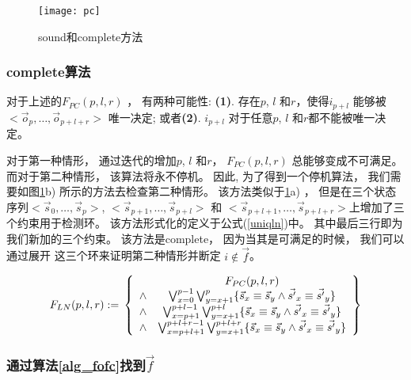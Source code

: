 \begin{figure}[t]
\begin{center}
\texttt{[image: pc]}
\end{center}
\caption{sound和complete方法}
  \label{fig_pc}
\end{figure}


%



\subsubsection{complete算法}\label{subsub_complete}
对于上述的$F_{PC}(p,l,r)$ ，
有两种可能性:
\textbf{(1)}. 存在$p$, $l$ 和$r$，使得$i_{p+l}$ 能够被$<\vec{o}_{p},\dots,\vec{o}_{p+l+r}>$ 唯一决定;
或者\textbf{(2)}. $i_{p+l}$ 对于任意$p$, $l$ 和$r$都不能被唯一决定。


对于第一种情形，
通过迭代的增加$p$, $l$ 和$r$，
$F_{PC}(p,l,r)$ 总能够变成不可满足。
而对于第二种情形，
该算法将永不停机。
因此,
为了得到一个停机算法，
我们需要如图\ref{fig_pc}b) 所示的方法去检查第二种情形。
该方法类似于\ref{fig_pc}a) ，
但是在三个状态序列$<\vec{s}_{0},\dots,\vec{s}_{p}>$, $<\vec{s}_{p+1},\dots,\vec{s}_{p+l}>$ 和
$<\vec{s}_{p+l+1},\dots,\vec{s}_{p+l+r}>$上增加了三个约束用于检测环。
该方法形式化的定义于公式(\ref{uniqln})中。
其中最后三行即为我们新加的三个约束。
该方法是complete，
因为当其是可满足的时候，
我们可以通过展开
这三个环来证明第二种情形并断定 $i\notin \vec{f}$。

\begin{equation}\label{uniqln}
F_{LN}(p,l,r):=\\
\left\{
\begin{array}{cc}
&F_{PC}(p,l,r)\\
\wedge&\bigvee_{x=0}^{p-1}\bigvee_{y=x+1}^{p} \{\vec{s}_x\equiv \vec{s}_y\wedge \vec{s'}_x\equiv \vec{s'}_y\} \\
\wedge&\bigvee_{x=p+1}^{p+l-1}\bigvee_{y=x+1}^{p+l} \{\vec{s}_x\equiv \vec{s}_y\wedge \vec{s'}_x\equiv \vec{s'}_y\} \\
\wedge&\bigvee_{x=p+l+1}^{p+l+r-1}\bigvee_{y=x+1}^{p+l+r} \{\vec{s}_x\equiv \vec{s}_y\wedge \vec{s'}_x\equiv \vec{s'}_y\}
\end{array}
\right\}
\end{equation}


\subsubsection{通过算法\ref{alg_fofc}找到$\vec{f}$ }\label{subsubsec_findfc}

